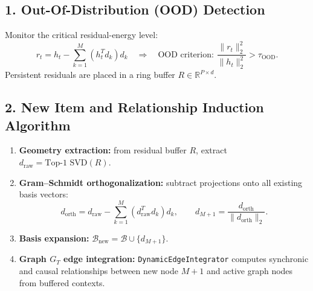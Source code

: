 \documentclass[11pt,a4paper]{article}
\begin{document}
\subsection*{1. Out-Of-Distribution (OOD) Detection}
Monitor the critical residual-energy level:
\begin{equation}r_t=h_t-\sum_{k=1}^M(h_t^Td_k)d_k\quad\Longrightarrow\quad\text{OOD criterion: }\frac{\|r_t\|_2^2}{\|h_t\|_2^2}>\tau_{\text{OOD}}.\end{equation}
Persistent residuals are placed in a ring buffer $R\in\mathbb R^{P\times d}$.
\begin{center}
\end{center}

\subsection*{2. New Item and Relationship Induction Algorithm}
\begin{enumerate}
\item \textbf{Geometry extraction:} from residual buffer $R$, extract $d_{\text{raw}}=\text{Top-1 SVD}(R)$.
\item \textbf{Gram--Schmidt orthogonalization:} subtract projections onto all existing basis vectors:
\begin{equation}d_{\text{orth}}=d_{\text{raw}}-\sum_{k=1}^M(d_{\text{raw}}^Td_k)d_k,\qquad d_{M+1}=\frac{d_{\text{orth}}}{\|d_{\text{orth}}\|_2}.\end{equation}
\item \textbf{Basis expansion:} $\mathcal B_{\text{new}}=\mathcal B\cup\{d_{M+1}\}$.
\item \textbf{Graph $G_T$ edge integration:} \texttt{DynamicEdgeIntegrator} computes synchronic and causal relationships between new node $M+1$ and active graph nodes from buffered contexts.
\end{enumerate}
\end{document}
